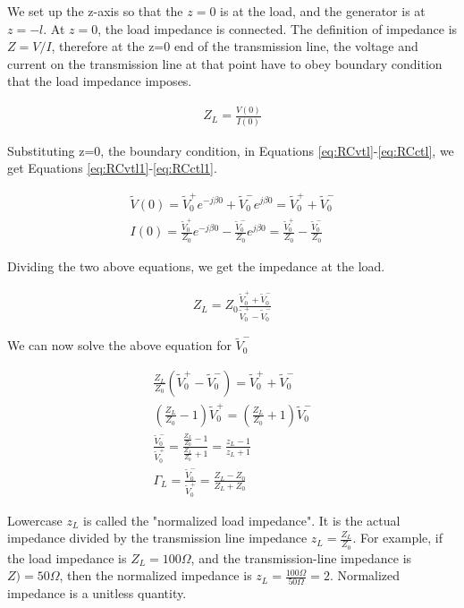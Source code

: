 \documentclass{ximera}
\begin{document}
We set up the z-axis so that the $z=0$ is at the load, and the generator is at $z=-l$. At $z=0$, the load impedance is connected. The definition of impedance is $Z=V/I$, therefore at the z=0 end of the transmission line, the voltage and current on the transmission line at that point have to obey boundary condition that the load impedance imposes.

\begin{eqnarray}
Z_L=\frac{V(0)}{I(0)} \nonumber 
\end{eqnarray}

Substituting z=0, the boundary condition, in Equations \ref{eq:RCvtl}-\ref{eq:RCctl}, we get Equations \ref{eq:RCvtl1}-\ref{eq:RCctl1}.

\begin{eqnarray}
\tilde{V}(0)=\tilde{V}_0^+ e^{-j \beta 0} +\tilde{V}_0^- e^{j \beta 0} = \tilde{V}_0^+ + \tilde{V}_0^- \label{eq:RCvtl1} \\ 
I(0)=\frac{\tilde{V}_0^+}{Z_0} e^{- j \beta 0} - \frac{\tilde{V}_0^-}{Z_0} e^{ j \beta 0} =\frac{\tilde{V}_0^+}{Z_0} - \frac{\tilde{V}_0^-}{Z_0}\label{eq:RCctl1}
\end{eqnarray}

Dividing the two above equations, we get the impedance at the load.


\begin{eqnarray}
Z_L=Z_0 \frac{\tilde{V}_0^+ + \tilde{V}_0^-}{\tilde{V}_0^+ - \tilde{V}_0^-}
\end{eqnarray}


We can now solve the above equation for $\tilde{V}_0^-$

\begin{eqnarray}
\frac{Z_L}{Z_0} (\tilde{V}_0^+ - \tilde{V}_0^-) = \tilde{V}_0^+ + \tilde{V}_0^- \nonumber \\
(\frac{Z_L}{Z_0}-1)\tilde{V}_0^+ =(\frac{Z_L}{Z_0}+1) \tilde{V}_0^- \nonumber \\
\frac{\tilde{V}_0^-}{\tilde{V}_0^+} = \frac{\frac{Z_L}{Z_0}-1  }{ \frac{Z_L}{Z_0}+1 } = \frac{z_L-1}{z_L+1}
\nonumber \\
\Gamma_L=\frac{\tilde{V}_0^-}{\tilde{V}_0^+} = \frac{Z_L -Z_0}{Z_L +Z_0}
\end{eqnarray}


 Lowercase $z_L$ is called the 
"normalized load impedance". It is the actual impedance divided by the transmission line impedance $z_L=\frac{Z_L}{Z_0}$. For example, if the load impedance is $Z_L=100 \Omega$, and the transmission-line impedance is $Z)=50 \Omega$, then the normalized impedance is $z_L=\frac{100 \Omega}{50 \Omega}=2$. Normalized impedance is a unitless quantity.
\end{document}

